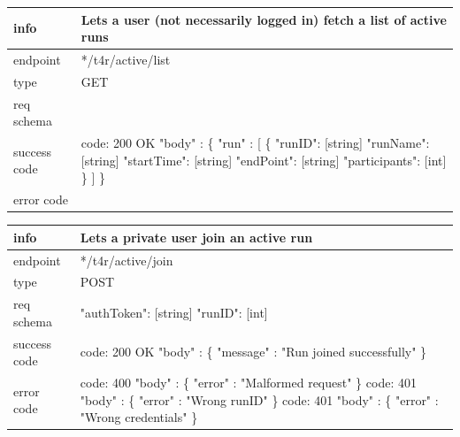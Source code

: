 \documentclass[titlepage]{article}
\begin{document}
\begin{tabularx}{\textwidth}{lX} \hline
    info & Lets a user (not necessarily logged in) fetch a list of active runs \\ \hline
    endpoint & */t4r/active/list \\ \hline
    type & GET \\ \hline
    req schema & \\ \hline
    success code &
        code: 200 OK \newline \newline 
        "body" : \{ \newline
        "run" : [ \{ \newline
        "runID": [string] \newline
        "runName": [string] \newline
        "startTime": [string] \newline
        "endPoint": [string] \newline
        "participants": [int] \newline
        \} ] \newline
        \} \\ \hline
    error code & 
\end{tabularx}
		
\vspace{\baselineskip}

\begin{tabularx}{\textwidth}{lX} \hline
    info & Lets a private user join an active run \\ \hline
    endpoint & */t4r/active/join \\ \hline
    type & POST \\ \hline
    req schema & \newline
    "authToken": [string] \newline
    "runID": [int] \\ \hline
    success code &
        code: 200 OK \newline  
        "body" : \{ \newline
        "message" : "Run joined successfully" \newline
        \} \\ \hline
    error code &
        code: 400 \newline
        "body" : \{ "error" : "Malformed request" \} \newline \newline
        code: 401 \newline
        "body" : \{ "error" : "Wrong runID" \} \newline \newline
        code: 401 \newline
        "body" : \{ "error" : "Wrong credentials" \} 
\end{tabularx}
		
\end{document}
